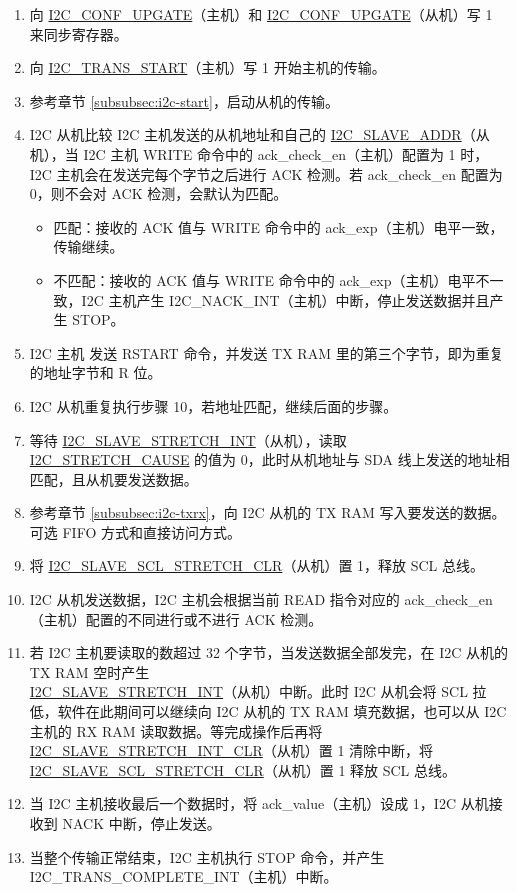 \documentclass[main\_\_CN.tex]{subfiles}
\begin{document}
\begin{enumerate}
\item 向 \hyperref[fielddesc:I2CCONFUPGATE]{I2C\_CONF\_UPGATE}（主机）和 \hyperref[fielddesc:I2CCONFUPGATE]{I2C\_CONF\_UPGATE}（从机）写 1 来同步寄存器。
\item 向 \hyperref[fielddesc:I2CTRANSSTART]{I2C\_TRANS\_START}（主机）写 1 开始主机的传输。
\item 参考章节 \ref{subsubsec:i2c-start}，启动从机的传输。
\item I2C 从机比较 I2C 主机发送的从机地址和自己的 \hyperref[fielddesc:I2CSLAVEADDR]{I2C\_SLAVE\_ADDR}（从机），当 I2C 主机 WRITE 命令中的 ack\_check\_en（主机）配置为 1 时，I2C 主机会在发送完每个字节之后进行 ACK 检测。若 ack\_check\_en 配置为 0，则不会对 ACK 检测，会默认为匹配。
\begin{itemize}
\item 匹配：接收的 ACK 值与 WRITE 命令中的 ack\_exp（主机）电平一致，传输继续。
\item 不匹配：接收的 ACK 值与 WRITE 命令中的 ack\_exp（主机）电平不一致，I2C 主机产生 I2C\_NACK\_INT（主机）中断，停止发送数据并且产生 STOP。
\end{itemize}

\item I2C 主机 发送 RSTART 命令，并发送 TX RAM 里的第三个字节，即为重复的地址字节和 R 位。
\item I2C 从机重复执行步骤 10，若地址匹配，继续后面的步骤。

\item 等待 \hyperref[int:i2c-slave-stretch]{I2C\_SLAVE\_STRETCH\_INT}（从机），读取 \hyperref[fielddesc:I2CSTRETCHCAUSE]{I2C\_STRETCH\_CAUSE} 的值为 0，此时从机地址与 SDA 线上发送的地址相匹配，且从机要发送数据。
\item 参考章节 \ref{subsubsec:i2c-txrx}，向 I2C 从机的 TX RAM 写入要发送的数据。可选 FIFO 方式和直接访问方式。
\item 将 \hyperref[fielddesc:I2CSLAVESCLSTRETCHCLR]{I2C\_SLAVE\_SCL\_STRETCH\_CLR}（从机）置 1，释放 SCL 总线。


\item I2C 从机发送数据，I2C 主机会根据当前 READ 指令对应的 ack\_check\_en（主机）配置的不同进行或不进行 ACK 检测。
\item 若 I2C 主机要读取的数超过 32 个字节，当发送数据全部发完，在 I2C 从机的 TX RAM 空时产生 \\\hyperref[int:i2c-slave-stretch]{I2C\_SLAVE\_STRETCH\_INT}（从机）中断。此时 I2C 从机会将 SCL 拉低，软件在此期间可以继续向 I2C 从机的 TX RAM 填充数据，也可以从 I2C 主机的 RX RAM 读取数据。等完成操作后再将 \hyperref[fielddesc:I2CSLAVESTRETCHINTCLR]{I2C\_SLAVE\_STRETCH\_INT\_CLR}（从机）置 1 清除中断，将 \hyperref[fielddesc:I2CSLAVESCLSTRETCHCLR]{I2C\_SLAVE\_SCL\_STRETCH\_CLR}（从机）置 1 释放 SCL 总线。

\item 当 I2C 主机接收最后一个数据时，将 ack\_value（主机）设成 1，I2C 从机接收到 NACK 中断，停止发送。

\item 当整个传输正常结束，I2C 主机执行 STOP 命令，并产生 I2C\_TRANS\_COMPLETE\_INT（主机）中断。
\end{enumerate}
\end{document}
